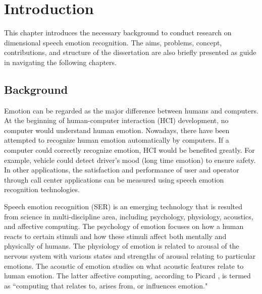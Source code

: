 \newtheorem{theo}{Theorem}
\newtheorem{lemma}{Lemma}
\newtheorem{col}{Corollary}
\newtheorem{defini}{Definition}
\newtheorem{pro}{Property}
\def\bm#1{\mbox{\boldmath{$#1$}}} \def\eqtri{\stackrel{\triangle}{=}}
\def\c#1{#1^{\dagger}} \newcommand{\gf}{\mbox{$GF(q)$}}
\newcommand{\av}[1]{\mbox{E${\displaystyle\left[ #1 \right]}$}} \def\r{\bm{r}}
\def\s{\bm{s}} \def\w{\bm{w}} \def\x{\bm{x}} \def\y{\bm{y}} \def\a{\bm{a}}
\def\u{\bm{u}} \def\cX{{\cal X}} \def\cY{{\cal Y}} \def\cP{{\cal P}}
\def\cV{{\cal V}} \newcommand{\g}{\mbox{$\Gamma$}}
\def\qed{\strut\hfill(Q.E.D.)} \def\eot{\strut\hfill$\Box$}
\def\osum{\bigcirc\hspace{-1.2em}\sum} \newcommand{\vt}[1]{\mbox{\boldmath
$#1$}}

\chapter{Introduction}
This chapter introduces the necessary background to conduct research on
dimensional speech emotion recognition. The aims, problems, concept,
contributions, and structure of the dissertation are also briefly presented as
guide in navigating the following chapters.

\section{Background}
Emotion can be regarded as the major difference between humans and computers.
At the beginning of human-computer interaction (HCI) development, no computer
would understand human emotion. Nowadays, there have been attempted to
recognize human emotion automatically by computers. If a computer could
correctly recognize emotion, HCI would be benefited greatly. For example, 
vehicle could detect driver's mood (long time emotion) to ensure safety. In
other applications, the satisfaction and performance of user and operator
through call center applications can be measured using speech emotion
recognition technologies.

Speech emotion recognition (SER) is an emerging technology that is resulted
from science in multi-discipline area, including psychology, physiology,
acoustics, and affective computing. The psychology of emotion focuses on how a
human reacts to certain stimuli and how these stimuli affect both mentally and
physically of humans. The physiology of emotion is related to arousal of the
nervous system with various states and strengths of arousal relating to
particular emotions. The acoustic of emotion studies on what acoustic features
relate to human emotion. The latter affective computing, according to Picard
\cite{Picard}, is termed as ``computing that relates to, arises from, or
influences emotion."

